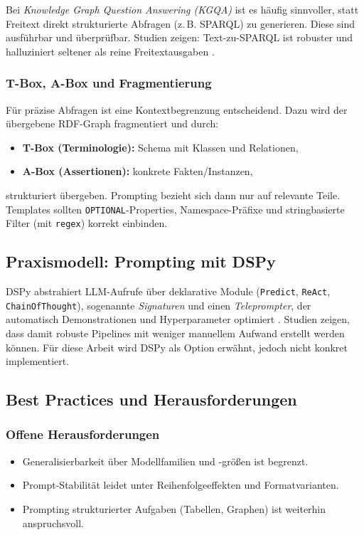 Bei \emph{Knowledge Graph Question Answering (KGQA)} ist es häufig sinnvoller, statt Freitext direkt strukturierte Abfragen (z.\,B. SPARQL) zu generieren. Diese sind ausführbar und überprüfbar. Studien zeigen: Text-zu-SPARQL ist robuster und halluziniert seltener als reine Freitextausgaben \cite{avila2024autokgqagpt}.

\subsubsection{T-Box, A-Box und Fragmentierung}

Für präzise Abfragen ist eine Kontextbegrenzung entscheidend. Dazu wird der übergebene RDF-Graph fragmentiert und durch:
\begin{itemize}
  \item \textbf{T-Box (Terminologie):} Schema mit Klassen und Relationen,
  \item \textbf{A-Box (Assertionen):} konkrete Fakten/Instanzen,
\end{itemize}
strukturiert übergeben. Prompting bezieht sich dann nur auf relevante Teile. Templates sollten \texttt{OPTIONAL}-Properties, Namespace-Präfixe und stringbasierte Filter (mit \texttt{regex}) korrekt einbinden.

\subsection{Praxismodell: Prompting mit DSPy}

DSPy abstrahiert LLM-Aufrufe über deklarative Module (\texttt{Predict}, \texttt{ReAct}, \texttt{ChainOfThought}), sogenannte \emph{Signaturen} und einen \emph{Teleprompter}, der automatisch Demonstrationen und Hyperparameter optimiert \cite{khattab2023dspy}. Studien zeigen, dass damit robuste Pipelines mit weniger manuellem Aufwand erstellt werden können. Für diese Arbeit wird DSPy als Option erwähnt, jedoch nicht konkret implementiert.

\subsection{Best Practices und Herausforderungen}

\subsubsection*{Offene Herausforderungen}
\begin{itemize}
  \item Generalisierbarkeit über Modellfamilien und -größen ist begrenzt.
  \item Prompt-Stabilität leidet unter Reihenfolgeeffekten und Formatvarianten.
  \item Prompting strukturierter Aufgaben (Tabellen, Graphen) ist weiterhin anspruchsvoll.
\end{itemize}

